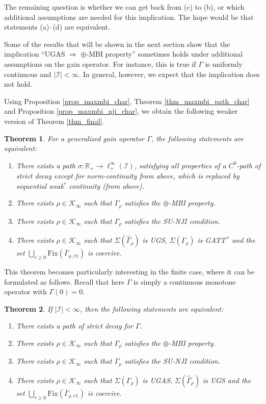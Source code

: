 \documentclass[10pt, oneside, a4paper]{article}
\newcommand{\R}{\mathbb{R}}
\newcommand{\unit}{\mathds{1}}
\newcommand{\Fix}{\mathrm{Fix}}
\newcommand{\IC}{\mathcal{I}}
\newcommand{\KC}{\mathcal{K}}
\newcommand{\bsign}[1]{\bar{#1}}
\newtheorem{theorem}{Theorem}[section]
\begin{document}
The remaining question is whether we can get back from (c) to (b), or which additional assumptions are needed for this implication. The hope would be that statements (a)--(d) are equivalent.%

Some of the results that will be shown in the next section show that the implication ``UGAS $\Rightarrow$ $\oplus$-MBI property'' sometimes holds under additional assumptions on the gain operator. For instance, this is true if $\Gamma$ is uniformly continuous and $|\IC| < \infty$. In general, however, we expect that the implication does not hold.

Using Proposition \ref{prop_maxmbi_char}, Theorem \ref{thm_maxmbi_path_char} and Proposition \ref{prop_maxmbi_nji_char}, we obtain the following weaker version of Theorem \ref{thm_final}.%

\begin{theorem}\label{thm_final_weak}
For a generalized gain operator $\Gamma$, the following statements are equivalent:%
\begin{enumerate}
\item[(a)] There exists a path $\sigma:\R_+ \rightarrow \ell^{\infty}_+(\IC)$, satisfying all properties of a $C^0$-path of strict decay except for norm-continuity from above, which is replaced by sequential weak$^*$ continuity (from above).%
\item[(b)] There exists $\rho \in \KC_{\infty}$ such that $\Gamma_{\rho}$ satisfies the $\oplus$-MBI property.%
\item[(c)] There exists $\rho \in \KC_{\infty}$ such that $\Gamma_{\rho}$ satisfies the SU-NJI condition.%
\item[(d)] There exists $\rho \in \KC_{\infty}$ such that $\Sigma(\hat{\Gamma}_{\rho})$ is UGS, $\Sigma(\Gamma_{\rho})$ is GATT$^{\,*}$ and the set $\bigcup_{r \geq 0}\Fix(\bsign{\Gamma}_{\rho,r\unit})$ is coercive.%
\end{enumerate}
\end{theorem}

This theorem becomes particularly interesting in the finite case, where it can be formulated as follows. Recall that here $\Gamma$ is simply a continuous monotone operator with $\Gamma(0) = 0$.%

\begin{theorem}\label{thm_final_weak_finite_case}
If $|\IC| < \infty$, then the following statements are equivalent:%
\begin{enumerate}
\item[(a)] There exists a path of strict decay for $\Gamma$.%
\item[(b)] There exists $\rho \in \KC_{\infty}$ such that $\Gamma_{\rho}$ satisfies the $\oplus$-MBI property.%
\item[(c)] There exists $\rho \in \KC_{\infty}$ such that $\Gamma_{\rho}$ satisfies the SU-NJI condition.%
\item[(d)] There exists $\rho \in \KC_{\infty}$ such that $\Sigma(\Gamma_{\rho})$ is UGAS, $\Sigma(\hat{\Gamma}_{\rho})$ is UGS and the set $\bigcup_{r \geq 0}\Fix(\bsign{\Gamma}_{\rho,r\unit})$ is coercive.%
\end{enumerate}
\end{theorem}
\end{document}

